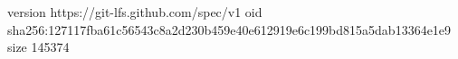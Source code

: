 version https://git-lfs.github.com/spec/v1
oid sha256:127117fba61c56543c8a2d230b459e40e612919e6c199bd815a5dab13364e1e9
size 145374
